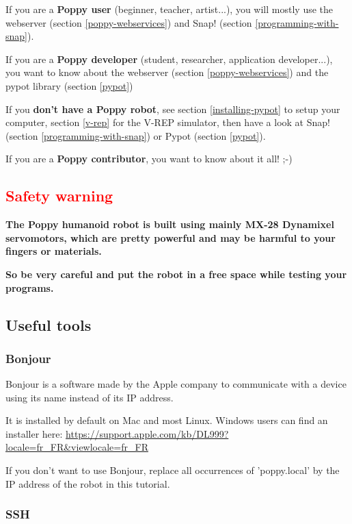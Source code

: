 \documentclass{article}
\begin{document}
If you are a \textbf{Poppy user} (beginner, teacher, artist...), you will mostly use the webserver (section \ref{poppy-webservices}) and Snap! (section \ref{programming-with-snap}).

If you are a \textbf{Poppy developer} (student, researcher, application developer...), you want to know about the webserver (section \ref{poppy-webservices}) and the pypot library (section \ref{pypot})

If you \textbf{don't have a Poppy robot}, see section \ref{installing-pypot} to setup your computer, section \ref{v-rep} for the V-REP simulator, then have a look at Snap! (section \ref{programming-with-snap}) or Pypot (section \ref{pypot}).

If you are a \textbf{Poppy contributor}, you want to know about it all! ;-)

\subsection{\textcolor{red}{Safety warning}}

\textbf{The Poppy humanoid robot is built using mainly MX-28 Dynamixel servomotors, which are pretty powerful and may be harmful to your fingers or materials.}

\textbf{So be very careful and put the robot in a free space while testing your programs.}

\subsection{Useful tools}

\subsubsection{Bonjour}

Bonjour is a software made by the Apple company to communicate with a device using its name instead of its IP address.

It is installed by default on Mac and most Linux. Windows users can find an installer here: \url{https://support.apple.com/kb/DL999?locale=fr_FR&viewlocale=fr_FR}

If you don't want to use Bonjour, replace all occurrences of 'poppy.local' by the IP address of the robot in this tutorial.

\subsubsection{SSH}
\end{document}
